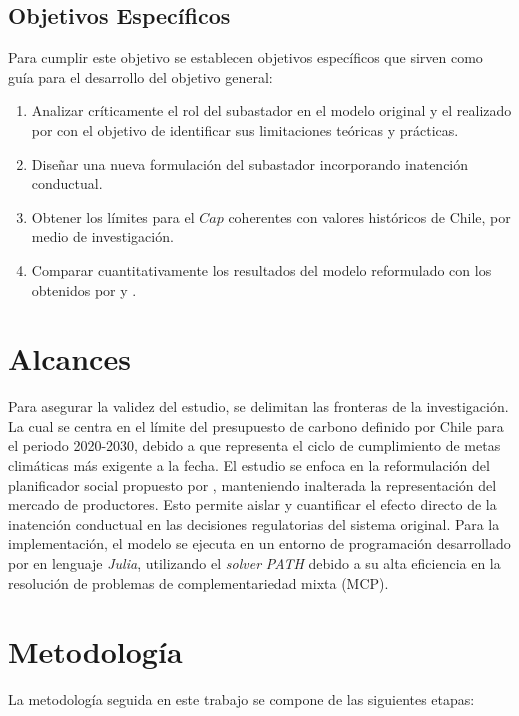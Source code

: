 \subsection{Objetivos Específicos}
Para cumplir este objetivo se establecen objetivos específicos que sirven como guía para el desarrollo del objetivo general:
\begin{enumerate}
    \item Analizar críticamente el rol del subastador en el modelo original y el realizado por  con el objetivo de identificar sus limitaciones teóricas y prácticas.
    \item Diseñar una nueva formulación del subastador incorporando inatención conductual.
    \item Obtener los límites para el $Cap$ coherentes con valores históricos de Chile, por medio de investigación. 
    \item Comparar cuantitativamente los resultados del modelo reformulado con los obtenidos por  y .
\end{enumerate}
\medskip
\section{Alcances}
Para asegurar la validez del estudio, se delimitan las fronteras de la investigación. La cual se centra en el límite del presupuesto de carbono definido por Chile para el periodo 2020-2030, debido a que representa el ciclo de cumplimiento de metas climáticas más exigente a la fecha. El estudio se enfoca en la reformulación del planificador social propuesto por , manteniendo inalterada la representación del mercado de productores. Esto permite aislar y cuantificar el efecto directo de la inatención conductual en las decisiones regulatorias del sistema original. Para la implementación, el modelo se ejecuta en un entorno de programación desarrollado por  en lenguaje \textit{Julia}, utilizando el \textit{solver} \textit{PATH} debido a su alta eficiencia en la resolución de problemas de complementariedad mixta (MCP).

\medskip

\section{Metodología}
La metodología seguida en este trabajo se compone de las siguientes etapas:

